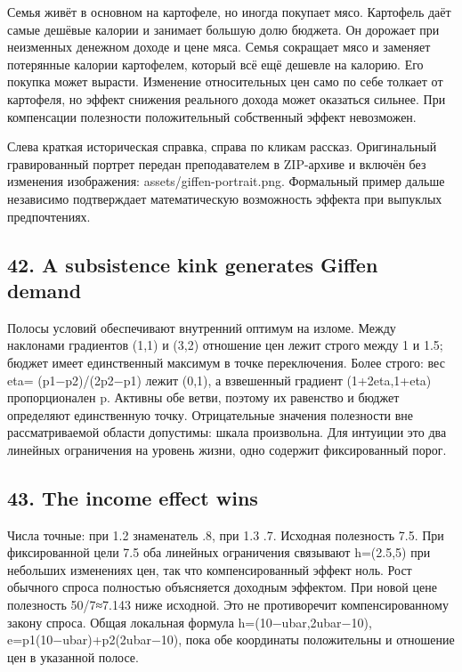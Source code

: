 \documentclass[11pt,a4paper]{article}
\begin{document}
Семья живёт в основном на картофеле, но иногда покупает мясо. Картофель даёт самые дешёвые калории и занимает большую долю бюджета. Он дорожает при неизменных денежном доходе и цене мяса. Семья сокращает мясо и заменяет потерянные калории картофелем, который всё ещё дешевле на калорию. Его покупка может вырасти. Изменение относительных цен само по себе толкает от картофеля, но эффект снижения реального дохода может оказаться сильнее. При компенсации полезности положительный собственный эффект невозможен.

Слева краткая историческая справка, справа по кликам рассказ. Оригинальный гравированный портрет передан преподавателем в ZIP-архиве и включён без изменения изображения: assets/giffen-portrait.png. Формальный пример дальше независимо подтверждает математическую возможность эффекта при выпуклых предпочтениях.

\subsection*{42. A subsistence kink generates Giffen demand}
Полосы условий обеспечивают внутренний оптимум на изломе. Между наклонами градиентов (1,1) и (3,2) отношение цен лежит строго между 1 и 1.5; бюджет имеет единственный максимум в точке переключения. Более строго: вес eta= (p1−p2)/(2p2−p1) лежит (0,1), а взвешенный градиент (1+2eta,1+eta) пропорционален p. Активны обе ветви, поэтому их равенство и бюджет определяют единственную точку. Отрицательные значения полезности вне рассматриваемой области допустимы: шкала произвольна. Для интуиции это два линейных ограничения на уровень жизни, одно содержит фиксированный порог.

\subsection*{43. The income effect wins}
Числа точные: при 1.2 знаменатель .8, при 1.3 .7. Исходная полезность 7.5. При фиксированной цели 7.5 оба линейных ограничения связывают h=(2.5,5) при небольших изменениях цен, так что компенсированный эффект ноль. Рост обычного спроса полностью объясняется доходным эффектом. При новой цене полезность 50/7≈7.143 ниже исходной. Это не противоречит компенсированному закону спроса. Общая локальная формула h=(10−ubar,2ubar−10), e=p1(10−ubar)+p2(2ubar−10), пока обе координаты положительны и отношение цен в указанной полосе.
\end{document}
